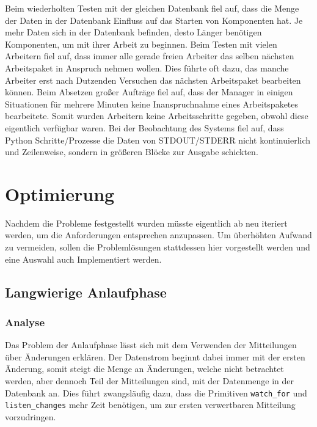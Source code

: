 \begin{description}
        Beim wiederholten Testen mit der gleichen Datenbank fiel auf, dass die Menge der Daten in der Datenbank Einfluss auf das Starten von Komponenten hat. Je mehr Daten sich in der Datenbank befinden, desto Länger benötigen Komponenten, um mit ihrer Arbeit zu beginnen.
        Beim Testen mit vielen Arbeitern fiel auf, dass immer alle gerade freien Arbeiter das selben nächsten Arbeitspaket in Anspruch nehmen wollen. Dies führte oft dazu, das manche Arbeiter erst nach Dutzenden Versuchen das nächsten Arbeitspaket bearbeiten können.
        Beim Absetzen großer Aufträge fiel auf, dass der Manager in einigen Situationen für mehrere Minuten keine Inanspruchnahme eines Arbeitspaketes bearbeitete. Somit wurden Arbeitern keine Arbeitsschritte gegeben, obwohl diese eigentlich verfügbar waren.
        Bei der Beobachtung des Systems fiel auf, dass Python Schritte/Prozesse
        die Daten von STDOUT/STDERR nicht kontinuierlich und Zeilenweise,
        sondern in größeren Blöcke zur Ausgabe schickten.
\end{description}

\chapter{Optimierung}

Nachdem die Probleme festgestellt wurden
müsste eigentlich ab  neu iteriert werden,
um die Anforderungen entsprechen anzupassen.
Um überhöhten Aufwand zu vermeiden,
sollen die Problemlösungen stattdessen hier vorgestellt werden
und eine Auswahl auch Implementiert werden.

\section{Langwierige Anlaufphase}

\subsection{Analyse}

Das Problem der Anlaufphase lässt sich mit dem Verwenden der Mitteilungen über Änderungen erklären. Der Datenstrom beginnt dabei immer mit der ersten Änderung,
somit steigt die Menge an Änderungen, welche nicht betrachtet werden, aber dennoch Teil der Mitteilungen sind, mit der Datenmenge in der Datenbank an.
Dies führt zwangsläufig dazu, dass die Primitiven \verb|watch_for| und \verb|listen_changes| mehr Zeit benötigen, um zur ersten verwertbaren Mitteilung vorzudringen.


